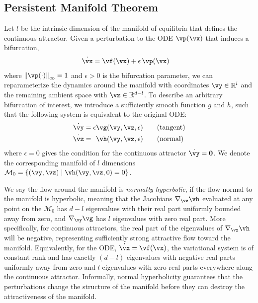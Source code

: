 \documentclass{article} %
\newcounter{ct}
\newcommand{\reals}{\mathbb{R}}
\newcommand{\manifold}{\mathcal{M}}
\newcommand{\uniformNorm}[1]{\left\|#1\right\|_\infty} %
\theoremstyle{definition}
\theoremstyle{remark}
\begin{document}
\subsection{Persistent Manifold Theorem}\label{sec:imt}
Let \(l\) be the intrinsic dimension of the manifold of equilibria that defines the continuous attractor.
Given a perturbation to the ODE \(\vp(\vx)\) that induces a bifurcation,
\begin{align}\label{eq:perturbation:nonparam}
	\dot{\vx} &= \vf(\vx) + \epsilon\,\vp(\vx)
\end{align}
where \(\uniformNorm{\vp(\cdot)} = 1\) and \(\epsilon > 0\) is the bifurcation parameter,
we can reparameterize the dynamics around the manifold with coordinates \(\vy \in \reals^l\) and the remaining ambient space with \(\vz \in \reals^{d-l}\).
To describe an arbitrary bifurcation of interest, we introduce a sufficiently smooth function \(g\) and \(h\), such that the following system is equivalent to the original ODE:
\begin{align}
    \dot{\vy} &=           \epsilon  \vg(\vy, \vz, \epsilon) \qquad \text{(tangent)}\label{eq:fenichel:flowtangent}\\
    \dot{\vz} &= \hphantom{\epsilon} \vh(\vy, \vz, \epsilon) \qquad \text{(normal)}\label{eq:fenichel:flownormal}
\end{align}
where \(\epsilon = 0\) gives the condition for the continuous attractor \(\dot{\vy} = \mathbf{0}\).
We denote the corresponding manifold of \(l\) dimensions \(\manifold_0 = \{(\vy,\vz) \mid \vh(\vy,\vz,0) = 0\}\).

We say the flow around the manifold is \emph{normally hyperbolic}, if the flow normal to the manifold is hyperbolic, meaning that the Jacobians \(\nabla_\vz \vh\) evaluated at any point on the \(\manifold_0\) has \(d-l\) eigenvalues with their real part uniformly bounded away from zero, and \(\nabla_\vy \vg\) has \(l\) eigenvalues with zero real part.
More specifically, for continuous attractors, the real part of the eigenvalues of \(\nabla_\vz \vh\) will be negative, representing sufficiently strong attractive flow toward the manifold.
Equivalently, for the ODE, \(\dot{\vx} = \vf(\vx)\), the variational system is of constant rank and has exactly \((d-l)\) eigenvalues with negative real parts uniformly away from zero and \(l\) eigenvalues with zero real parts everywhere along the continuous attractor.
Informally, normal hyperbolicity guarantees that the perturbations change the structure of the manifold before they can destroy the attractiveness of the manifold.
\end{document}
